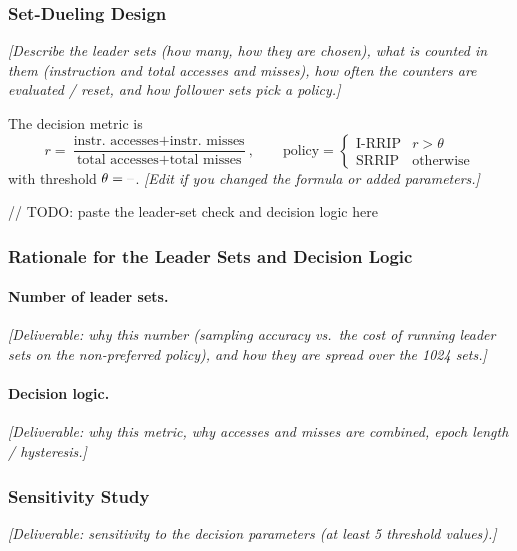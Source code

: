 \documentclass[11pt,a4paper]{article}
\theoremstyle{themethm}
\theoremstyle{themedef}
\theoremstyle{themeex}
\theoremstyle{themerem}
\newcommand{\tbd}{\textcolor{black!40}{\textnormal{--}}}
\newcommand{\todo}[1]{\textcolor{black!55}{\textit{[#1]}}}
\begin{document}
\subsubsection{Set-Dueling Design}\label{sec:dyn-design}
\todo{Describe the leader sets (how many, how they are chosen), what is counted in them (instruction and total accesses and misses), how often the counters are evaluated / reset, and how follower sets pick a policy.}

The decision metric is
\begin{equation}
  r = \frac{\text{instr.\ accesses} + \text{instr.\ misses}}{\text{total accesses} + \text{total misses}},
  \qquad
  \text{policy} =
  \begin{cases}
    \text{I-RRIP} & r > \theta \\
    \text{SRRIP}  & \text{otherwise}
  \end{cases}
  \label{eq:dyn}
\end{equation}
with threshold $\theta = \tbd$. \todo{Edit if you changed the formula or added parameters.}

\begin{cppcode}
// TODO: paste the leader-set check and decision logic here
\end{cppcode}

\subsubsection{Rationale for the Leader Sets and Decision Logic}\label{sec:dyn-rationale}
\paragraph{Number of leader sets.} \todo{Deliverable: why this number (sampling accuracy vs.\ the cost of running leader sets on the non-preferred policy), and how they are spread over the 1024 sets.}

\paragraph{Decision logic.} \todo{Deliverable: why this metric, why accesses and misses are combined, epoch length / hysteresis.}

\subsubsection{Sensitivity Study}\label{sec:dyn-sensitivity}
\todo{Deliverable: sensitivity to the decision parameters (at least 5 threshold values).}
\end{document}
